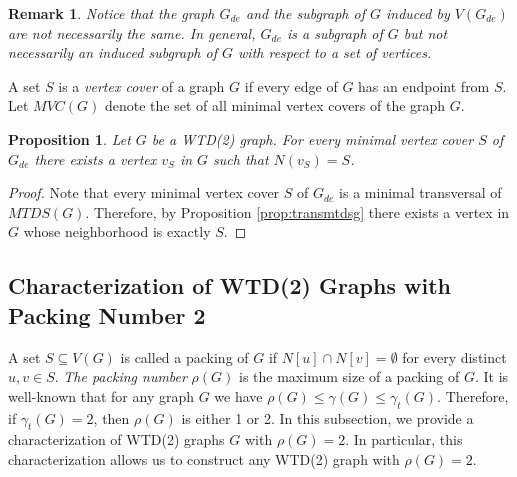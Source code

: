 \documentclass[11pt]{article}
\newtheorem{proposition}[theorem]{Proposition}
\newtheorem{remark}[theorem]{Remark}
\theoremstyle{definition}
\begin{document}
\begin{remark}
Notice that the graph $G_{de}$ and the subgraph of $G$ induced by $V(G_{de})$ are not necessarily the same.
In general, $G_{de}$ is a subgraph of $G$ but not necessarily an induced subgraph of $G$ with respect to a set of vertices.
\end{remark}

A set $S$ is a \emph{vertex cover} of a graph $G$ if every edge of $G$ has an endpoint from $S$.
Let $MVC(G)$ denote the set of all minimal vertex covers of the graph $G$.

\begin{proposition}\label{prop:wtd2}
Let $G$ be a WTD(2) graph.
For every minimal vertex cover $S$ of $G_{de}$ there exists a vertex $v_S$ in $G$ such that $N(v_S)=S$.
\end{proposition}
\begin{proof}
Note that every minimal vertex cover $S$ of $G_{de}$ is a minimal transversal of $MTDS(G)$.
Therefore, by Proposition \ref{prop:transmtdsg} there exists a vertex in $G$ whose neighborhood is exactly $S$.
\end{proof}

\subsection{Characterization of WTD(2) Graphs with Packing Number 2}\label{sec:wtd2ro2}
A set $S\subseteq V(G)$ is called a packing of $G$ if $N[u]\cap N[v]=\emptyset$ for every distinct $u,v\in S$.
\emph{The packing number} $\rho(G)$ is the maximum size of a packing of $G$. It is well-known that for any graph $G$ we have $\rho(G) \leq \gamma(G) \leq \gamma_t(G)$.
Therefore, if $\gamma_t(G)=2$, then $\rho(G)$ is either 1 or 2.
In this subsection, we provide a characterization of WTD(2) graphs $G$ with $\rho(G)=2$.
In particular, this characterization allows us to construct any WTD(2) graph with $\rho(G)=2$.
\end{document}
